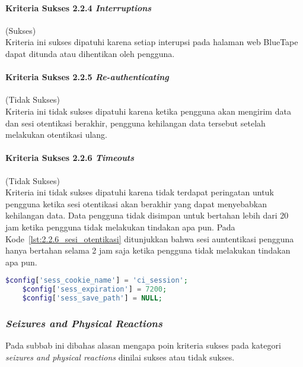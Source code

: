 \paragraph{Kriteria Sukses 2.2.4 \textit{Interruptions}}
\label{par:kepatuhan_bluetape_kriteria_sukses_2.2.4}
(Sukses)\\

Kriteria ini sukses dipatuhi karena setiap interupsi pada halaman web BlueTape dapat ditunda atau dihentikan oleh pengguna.

\paragraph{Kriteria Sukses 2.2.5 \textit{Re-authenticating}}
\label{par:kepatuhan_bluetape_kriteria_sukses_2.2.5}
(Tidak Sukses)\\

Kriteria ini tidak sukses dipatuhi karena ketika pengguna akan mengirim data dan sesi otentikasi berakhir, pengguna kehilangan data tersebut setelah melakukan otentikasi ulang.

\paragraph{Kriteria Sukses 2.2.6 \textit{Timeouts}}
\label{par:kepatuhan_bluetape_kriteria_sukses_2.2.6}
(Tidak Sukses)\\

Kriteria ini tidak sukses dipatuhi karena tidak terdapat peringatan untuk pengguna ketika sesi otentikasi akan berakhir yang dapat menyebabkan kehilangan data. Data pengguna tidak disimpan untuk bertahan lebih dari 20 jam ketika pengguna tidak melakukan tindakan apa pun. Pada \mbox{Kode \ref{lst:2.2.6_sesi_otentikasi}} ditunjukkan bahwa sesi auntentikasi pengguna hanya bertahan selama 2 jam saja ketika pengguna tidak melakukan tindakan apa pun.

\begin{lstlisting}[frame=single, label={lst:2.2.6_sesi_otentikasi}, language=PHP, caption=Pelanggaran Kriteria Sukses 2.2.6 pada Bagian Sesi Otentikasi]
    $config['sess_cookie_name'] = 'ci_session';
    $config['sess_expiration'] = 7200;
    $config['sess_save_path'] = NULL;
\end{lstlisting}

\subsubsection{\textit{Seizures and Physical Reactions}}
\label{subsubsec:kepatuhan_bluetape_seizures_and_physical_reactions}
Pada subbab ini dibahas alasan mengapa poin kriteria sukses pada kategori \textit{seizures and physical reactions} dinilai sukses atau tidak sukses.

